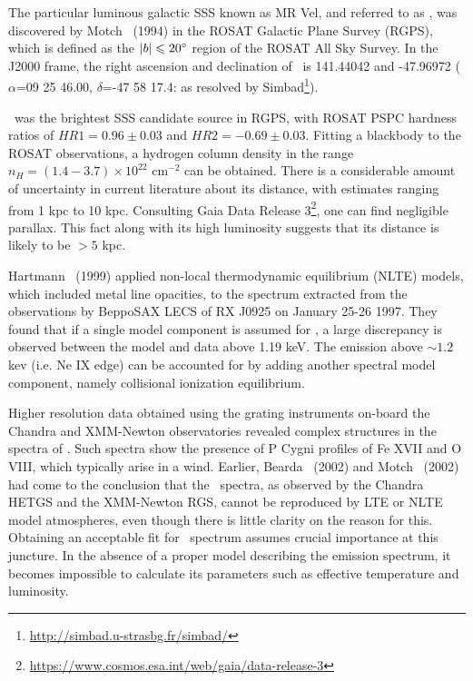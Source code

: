 		The particular luminous galactic SSS known as MR Vel, and referred to as \source, was discovered by Motch \etal\ (1994) \cite{motch1994} in the ROSAT Galactic Plane Survey (RGPS), which  is defined as the $|b|\leqslant 20\degree$ region of the ROSAT All Sky Survey. In the J2000 frame, the right ascension and declination of \source\ is 141.44042 and -47.96972 ($\alpha$=09 25 46.00, $\delta$=-47 58 17.4: as resolved by Simbad\footnote{\url{http://simbad.u-strasbg.fr/simbad/}}).
		
		\source\ was the brightest SSS candidate source in RGPS, with ROSAT PSPC hardness ratios of $HR1=0.96\pm 0.03$ and $HR2=-0.69\pm 0.03$. Fitting a blackbody to the ROSAT observations, a hydrogen column density in the range $n_H=(1.4-3.7)\times 10^{22}$ cm$^{-2}$ can be obtained. There is a considerable amount of uncertainty in current literature about its distance, with estimates ranging from 1 kpc to 10 kpc. Consulting Gaia Data Release 3\footnote{\url{https://www.cosmos.esa.int/web/gaia/data-release-3}}, one can find negligible parallax. This fact along with its high luminosity suggests that its distance is likely to be $>5$ kpc.
		
		Hartmann \etal\ (1999) \cite{hartmann1999constraining} applied non-local thermodynamic equilibrium (NLTE) models, which included metal line opacities, to the spectrum extracted from the observations by BeppoSAX LECS of RX J0925 on January 25-26 1997. They found that if a single model component is assumed for \source, a large discrepancy is observed between the model and data above 1.19 keV. The emission above $\sim 1.2$ kev (i.e. Ne IX edge) can be accounted for by adding another spectral model component, namely collisional ionization equilibrium.
		
		Higher resolution data obtained using the grating instruments on-board the Chandra and XMM-Newton observatories revealed complex structures in the spectra of \source. Such spectra show the presence of P Cygni profiles of Fe XVII and O VIII, which typically arise in a wind. Earlier, Bearda \etal\ (2002) \cite{beardaChandra2002AA} and Motch \etal\ (2002) \cite{motchXmmNewton2002AA} had come to the conclusion that the \source\ spectra, as observed by the Chandra HETGS and the XMM-Newton RGS, cannot be reproduced by LTE or NLTE model atmospheres, even though there is little clarity on the reason for this. Obtaining an acceptable fit for \source\ spectrum assumes crucial importance at this juncture. In the absence of a proper model describing the emission spectrum, it becomes impossible to calculate its parameters such as effective temperature and luminosity.
		
